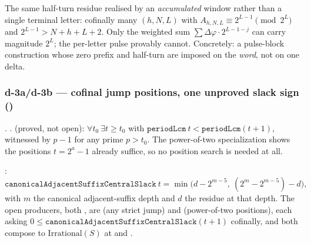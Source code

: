 \begin{prop}
The same half-turn residue realised by an \emph{accumulated} window rather than a single terminal
letter: cofinally many $(h,N,L)$ with $A_{h,N,L}\equiv 2^{L-1}\pmod{2^L}$ and
$2^{L-1} > N{+}h{+}L{+}2$. Only the weighted sum $\sum \Delta\varphi\cdot 2^{L-1-j}$ can carry
magnitude $2^L$; the per-letter pulse provably cannot. Concretely: a pulse-block construction whose
zero prefix and half-turn are imposed on the \emph{word}, not on one delta.
\end{prop}

\subsubsection{d-3a/d-3b --- cofinal jump positions, one unproved slack sign ()}

\begin{thm}
. .
 (proved, not open): $\forall t_0\ \exists t\ge t_0$ with
$\mathtt{periodLcm}\ t < \mathtt{periodLcm}(t{+}1)$, witnessed by $p{-}1$ for any prime $p>t_0$.
The power-of-two specialization
 shows
the positions $t=2^a{-}1$ already suffice, so no position search is needed at all.
\end{thm}

\begin{defn}
:
\[
  \mathtt{canonicalAdjacentSuffixCentralSlack}\ t = \min\bigl(d-2^{m-5},\ (2^m-2^{m-5})-d\bigr),
\]
with $m$ the canonical adjacent-suffix depth and $d$ the residue at that depth. The open
producers, both  , are
 (any strict
jump) and 
(power-of-two positions), each asking $0\le \mathtt{canonicalAdjacentSuffixCentralSlack}(t{+}1)$
cofinally, and both compose to
$\mathrm{Irrational}(S)$ at
and
.
\end{defn}

